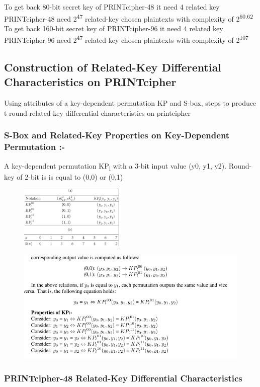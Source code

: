 \documentclass[journal=tosc,preprint]{iacrtrans}
\begin{document}
To get back  80-bit secret key of PRINTcipher-48 it need 4 related key
PRINTcipher-48 need 2\textsuperscript{47} related-key chosen plaintexts with complexity of 2\textsuperscript{60.62}
To get back  160-bit secret key of PRINTcipher-96 it need 4 related key
PRINTcipher-96 need 2\textsuperscript{47} related-key chosen plaintexts with complexity of 2\textsuperscript{107}

\subsection{Construction of Related-Key Differential Characteristics on PRINTcipher}
Using attributes of a key-dependent permutation KP and S-box, steps to produce t round related-key differential characteristics on printcipher
\subsubsection{S-Box and Related-Key Properties on Key-Dependent Permutation :-}
 A key-dependent permutation KP\textsubscript{l} with a 3-bit input value (y0, y1, y2). Round-key of 2-bit is  is equal to (0,0) or  (0,1)

\begin{figure}[ht]
	\centering\includegraphics[width=5cm]{pics/3.png}
\end{figure}

\begin{figure}[ht]
	\centering
	\includegraphics{pics/1.png}
\end{figure}

\subsubsection{PRINTcipher-48 Related-Key Differential Characteristics}
\end{document}
